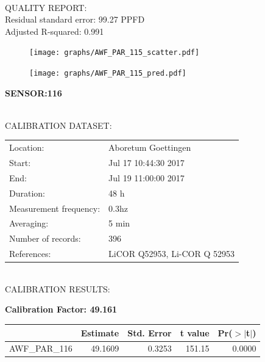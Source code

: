 \documentclass[oneside]{report}
\begin{document}
\hrulefill\\
QUALITY REPORT:\\
Residual standard error: 99.27 PPFD\\
Adjusted R-squared: 0.991



\begin{figure}[H]
  \centering
  \texttt{[image: graphs/AWF\_PAR\_115\_scatter.pdf]}
\end{figure}




\begin{figure}[H]
  \centering
  \texttt{[image: graphs/AWF\_PAR\_115\_pred.pdf]}
\end{figure}

\pagebreak


\begin{center}
\large{\textbf{SENSOR:116}}\\
\end{center}

\hrulefill\\
CALIBRATION DATASET:\\
\begin{table}[h!]
  \centering
  \label{tab:table1}
  \begin{tabular}{ll}
    Location: & Aboretum Goettingen\\ 
    
    
    Start:  & Jul 17 10:44:30 2017 \\
    End:   & Jul 19 11:00:00 2017\\ 
    Duration: & 48 h\\
    Measurement frequency: & 0.3hz\\
    Averaging:  &5 min\\
    Number of records: & 396 \\
    References: & LiCOR Q52953, Li-COR Q 52953 \\
  \end{tabular}
\end{table}

\hrulefill\\
CALIBRATION RESULTS:\\


\begin{center}
\textbf{\large{Calibration Factor: 49.161}}\\
\end{center}
\begin{table}[ht]
\centering
\begin{tabular}{rrrrr}
  \hline
 & Estimate & Std. Error & t value & Pr($>$$|$t$|$) \\ 
  \hline
AWF\_PAR\_116 & 49.1609 & 0.3253 & 151.15 & 0.0000 \\ 
   \hline
\end{tabular}
\end{table}
\end{document}
